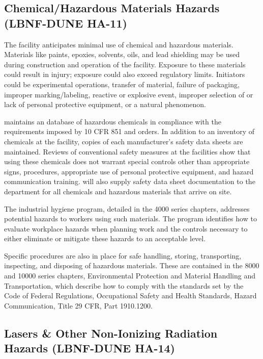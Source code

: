\subsection{Chemical/Hazardous Materials Hazards (LBNF-DUNE HA-11)}

The  facility anticipates minimal use of chemical and hazardous
materials. Materials like paints, epoxies, solvents, oils, and lead
shielding may be used during construction and operation of the
facility. Exposure to these materials could result in injury; 
exposure could also exceed regulatory limits. Initiators could be
experimental operations, transfer of material, failure of packaging,
improper marking/labeling, reactive or explosive event, improper
selection of or lack of personal protective equipment, or a
natural phenomenon.

\fnal maintains an database of hazardous chemicals in compliance with
the requirements imposed by 10 CFR 851 and  orders. In
addition to an inventory of chemicals at the facility, copies of each
manufacturer's safety data sheets are maintained. Reviews of
conventional safety measures at the facilities show that using these
chemicals does not warrant special controls other than appropriate
signs, procedures, appropriate use of personal protective equipment,
and hazard communication training.  will also supply
safety data sheet documentation to the  
department for all chemicals and hazardous materials that arrive on
site.

The industrial hygiene program, detailed in the  4000
series chapters, addresses potential hazards to workers using such
materials. The program identifies how to evaluate workplace hazards
when planning work and the controls necessary to either eliminate or
mitigate these hazards to an acceptable level.

Specific procedures are also in place for safe handling, storing,
transporting, inspecting, and disposing of hazardous materials. These
are contained in the  8000 and 10000 series chapters,
Environmental Protection and Material Handling and Transportation,
which describe how to comply with the standards set by the Code of
Federal Regulations, Occupational Safety and Health Standards, Hazard
Communication, Title 29 CFR, Part 1910.1200.


\subsection{Lasers \& Other Non-Ionizing Radiation Hazards (LBNF-DUNE HA-14)}
\label{sec:tc-esh-lasers}

